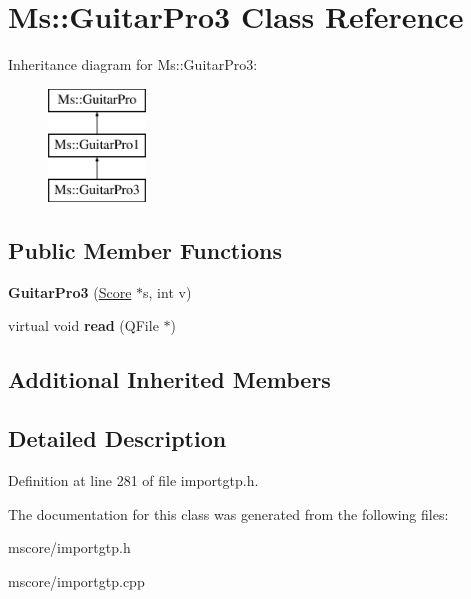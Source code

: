 \hypertarget{class_ms_1_1_guitar_pro3}{}\section{Ms\+:\+:Guitar\+Pro3 Class Reference}
\label{class_ms_1_1_guitar_pro3}
Inheritance diagram for Ms\+:\+:Guitar\+Pro3\+:\begin{figure}[H]
\begin{center}
\leavevmode
\includegraphics[height=3.000000cm]{class_ms_1_1_guitar_pro3}
\end{center}
\end{figure}
\subsection*{Public Member Functions}
\begin{DoxyCompactItemize}
\item 
\mbox{\label{class_ms_1_1_guitar_pro3_a0a5180e6f67aecf9e7645ee390348a6c}} 
{\bfseries Guitar\+Pro3} (\hyperlink{class_ms_1_1_score}{Score} $\ast$s, int v)
\item 
\mbox{\label{class_ms_1_1_guitar_pro3_a9ea29c3df0e2e616a51e5356a92ff8b5}} 
virtual void {\bfseries read} (Q\+File $\ast$)
\end{DoxyCompactItemize}
\subsection*{Additional Inherited Members}


\subsection{Detailed Description}


Definition at line 281 of file importgtp.\+h.



The documentation for this class was generated from the following files\+:\begin{DoxyCompactItemize}
\item 
mscore/importgtp.\+h\item 
mscore/importgtp.\+cpp\end{DoxyCompactItemize}

